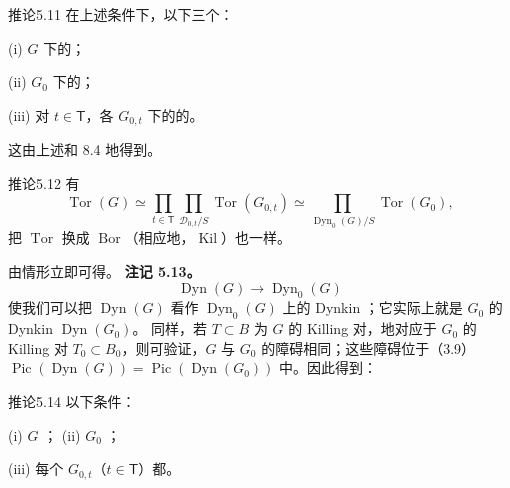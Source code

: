 \begin{SGAresult}{推论}{5.11}
在上述条件下，以下三个：

(i) $G$ 下的；

(ii) $G_0$ 下的；

(iii) 对 $t\in\mathsf T$，各 $G_{0,t}$ 下的的。
\end{SGAresult}
这由上述和 8.4 地得到。
\begin{SGAresult}{推论}{5.12}
有
\[\operatorname{Tor}(G)\simeq\prod_{t\in\mathsf T}\prod_{\mathscr D_{0,t}/S}\operatorname{Tor}(G_{0,t})\simeq\prod_{\operatorname{Dyn}_0(G)/S}\operatorname{Tor}(G_0),\]
把 $\operatorname{Tor}$ 换成 $\operatorname{Bor}$（相应地，$\operatorname{Kil}$）也一样。
\end{SGAresult}
由情形立即可得。
\textbf{注记 5.13。} 
\[\operatorname{Dyn}(G)\longrightarrow\operatorname{Dyn}_0(G)\]
使我们可以把 $\operatorname{Dyn}(G)$ 看作 $\operatorname{Dyn}_0(G)$ 上的 Dynkin ；它实际上就是 $G_0$ 的 Dynkin  $\operatorname{Dyn}(G_0)$。
同样，若 $T\subset B$ 为 $G$ 的 Killing 对，地对应于 $G_0$ 的 Killing 对 $T_0\subset B_0$，则可验证，$G$ 与 $G_0$ 的障碍相同；这些障碍位于（3.9）$\operatorname{Pic}(\operatorname{Dyn}(G))=\operatorname{Pic}(\operatorname{Dyn}(G_0))$ 中。因此得到：
\begin{SGAresult}{推论}{5.14}
以下条件：

(i) $G$ ；
(ii) $G_0$ ；

(iii) 每个 $G_{0,t}$（$t\in\mathsf T$）都。
\end{SGAresult}

